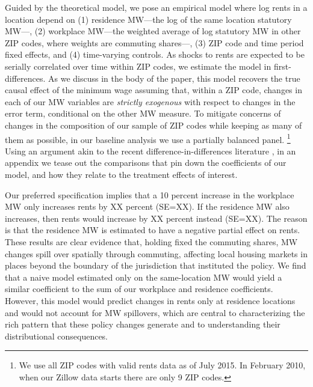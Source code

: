 Guided by the theoretical model, we pose an empirical model where log rents in 
a location depend on
(1) residence MW---the log of the same location statutory MW---,
(2) workplace MW---the weighted average of log statutory MW in other ZIP codes,
where weights are commuting shares---,
(3)  ZIP code and time period fixed effects,
and 
(4) time-varying controls.
As shocks to rents are expected to be serially correlated over time within ZIP codes, 
we estimate the model in first-differences.
As we discuss in the body of the paper, this model recovers the true causal effect
of the minimum wage assuming that, within a ZIP code, changes in each of our MW 
variables are \textit{strictly exogenous} with respect to changes in the error 
term, conditional on the other MW measure.
To mitigate concerns of changes in the composition of our sample of ZIP codes 
while keeping as many of them as possible, in our baseline analysis we use a 
partially balanced panel.%
\footnote{We use all ZIP codes with valid rents data as of July 2015. 
In February 2010, when our Zillow data starts there are only 9 ZIP codes.}
Using an argument akin to the recent difference-in-differences literature
\parencite[e.g.,][]{CallawaySantAnna2021,CallawayEtAl2021}, 
in an appendix we tease out the comparisons that pin down the coefficients of our 
model, and how they relate to the treatment effects of interest.


Our preferred specification implies that a 10 percent increase in the workplace
MW only increases rents by XX percent (SE=XX).
If the residence MW also increases, then rents would increase by XX percent 
instead (SE=XX).
The reason is that the residence MW is estimated to have a negative partial effect
on rents.
These results are clear evidence that, holding fixed the commuting shares, MW 
changes spill over spatially through commuting, affecting local housing markets 
in places beyond the boundary of the jurisdiction that instituted the policy.
We find that a naive model estimated only on the same-location MW would yield a 
similar coefficient to the sum of our workplace and residence coefficients.
However, this model would predict changes in rents only at residence locations and 
would not account for MW spillovers, which are central to characterizing the rich
pattern that these policy changes generate and to understanding their 
distributional consequences.

